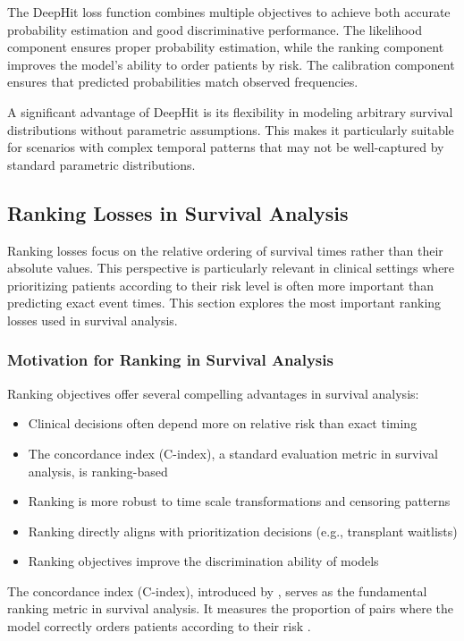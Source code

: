 The DeepHit loss function combines multiple objectives to achieve both accurate probability estimation and good discriminative performance. The likelihood component ensures proper probability estimation, while the ranking component improves the model's ability to order patients by risk. The calibration component ensures that predicted probabilities match observed frequencies.

A significant advantage of DeepHit is its flexibility in modeling arbitrary survival distributions without parametric assumptions. This makes it particularly suitable for scenarios with complex temporal patterns that may not be well-captured by standard parametric distributions.

\subsection{Ranking Losses in Survival Analysis}
\label{sec:ranking}

Ranking losses focus on the relative ordering of survival times rather than their absolute values. This perspective is particularly relevant in clinical settings where prioritizing patients according to their risk level is often more important than predicting exact event times. This section explores the most important ranking losses used in survival analysis.

\subsubsection{Motivation for Ranking in Survival Analysis}

Ranking objectives offer several compelling advantages in survival analysis:

\begin{itemize}
\item Clinical decisions often depend more on relative risk than exact timing
\item The concordance index (C-index), a standard evaluation metric in survival analysis, is ranking-based
\item Ranking is more robust to time scale transformations and censoring patterns
\item Ranking directly aligns with prioritization decisions (e.g., transplant waitlists)
\item Ranking objectives improve the discrimination ability of models
\end{itemize}

The concordance index (C-index), introduced by \textcite{harrell1982}, serves as the fundamental ranking metric in survival analysis. It measures the proportion of pairs where the model correctly orders patients according to their risk \parencite{antolini2005}.

